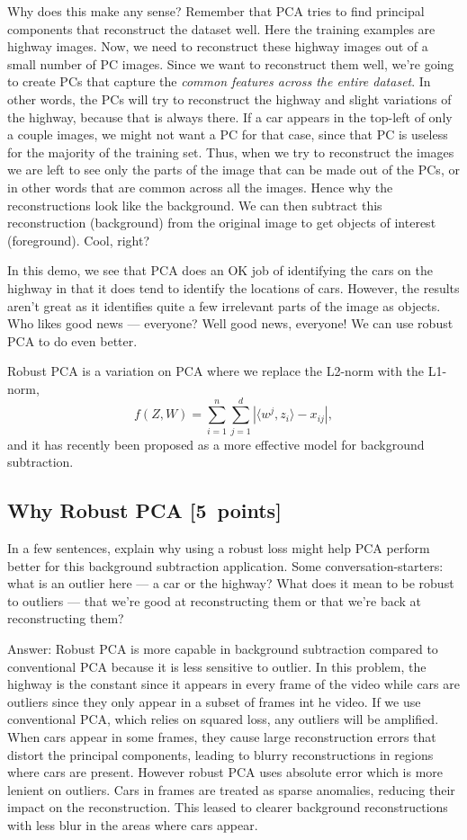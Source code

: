 \documentclass{article}
\newcommand{\blu}[1]{{\textcolor{blu}{#1}}}
\newcommand{\gre}[1]{\textcolor{gre}{#1}}
\newcommand\ans[1]{\par\gre{Answer: #1}}
\let\ask\blu
\newcommand\pts[1]{\textcolor{pointscolour}{[#1~points]}}
\begin{document}
Why does this make any sense? Remember that PCA tries to find principal components that reconstruct the dataset well. Here the training examples are highway images. Now, we need to reconstruct these highway images out of a small number of PC images. Since we want to reconstruct them well, we're going to create PCs that capture the \emph{common features across the entire dataset}. In other words, the PCs will try to reconstruct the highway and slight variations of the highway, because that is always there. If a car appears in the top-left of only a couple images, we might not want a PC for that case, since that PC is useless for the majority of the training set. Thus, when we try to reconstruct the images we are left to see only the parts of the image that can be made out of the PCs, or in other words that are common across all the images. Hence why the reconstructions look like the background. We can then subtract this reconstruction (background) from the original image to get objects of interest (foreground). Cool, right?

In this demo, we see that PCA does an OK job of identifying the cars on the highway in that it does tend to identify the locations of cars. However, the results aren't great as it identifies quite a few irrelevant parts of the image as objects. Who likes good news --- everyone? Well good news, everyone! We can use robust PCA to do even better.

Robust PCA is a variation on PCA where we replace the L2-norm with the L1-norm,
\[
f(Z,W) = \sum_{i=1}^n\sum_{j=1}^d |\langle w^j, z_i\rangle - x_{ij}|,
\]
and it has recently been proposed as a more effective model for background subtraction.

\subsection{Why Robust PCA \pts{5}}

\ask{In a few sentences, explain why using a robust loss might help PCA perform better for this background subtraction application.} Some conversation-starters: what is an outlier here --- a car or the highway? What does it mean to be robust to outliers --- that we're good at reconstructing them or that we're back at reconstructing them?

\ans{ Robust PCA is more capable in background subtraction compared to conventional PCA because it is less sensitive to outlier. In this problem, the highway is the constant since it appears in every frame of the video while cars are outliers since they only appear in a subset of frames int he video. If we use conventional PCA, which relies on squared loss, any outliers will be amplified. When cars appear in some frames, they cause large reconstruction errors that distort the principal components, leading to blurry reconstructions in regions where cars are present. However robust PCA uses absolute error which is more lenient on outliers. Cars in frames are treated as sparse anomalies, reducing their impact on the reconstruction. This leased to clearer background reconstructions with less blur in the areas where cars appear. }
\newpage
\end{document}
